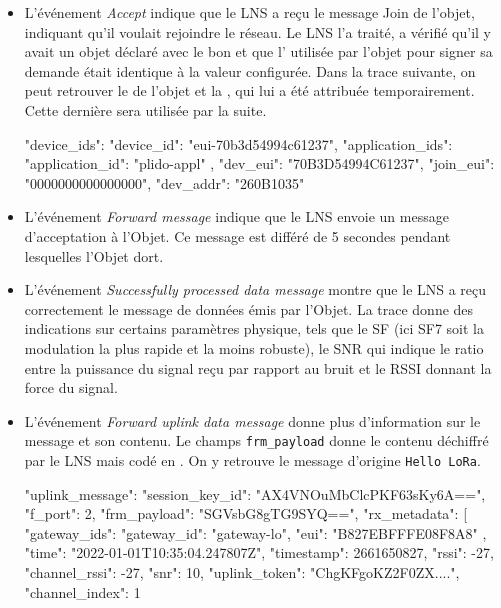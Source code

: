 \begin{itemize}
    \item L'événement \textit{Accept } indique que le LNS a reçu le message Join de l'objet, indiquant qu'il voulait rejoindre le réseau. Le LNS l'a traité, a vérifié qu'il y avait un objet déclaré avec le bon \textit{} et que l'\textit{} utilisée par l'objet pour signer sa demande était identique à la valeur configurée. Dans la trace suivante, on peut retrouver le \textit{} de l'objet et la \textit{}, qui lui a été attribuée temporairement. Cette dernière sera utilisée par la suite.
    
\begin{termc}[backgroundcolor=\color{blue!10}, basicstyle=\ttfamily\small, escapechar=@] 
    "device_ids": {
        "device_id": "eui-70b3d54994c61237",
        "application_ids": {
          "application_id": "plido-appl"
        },
        "dev_eui": "70B3D54994C61237",
        "join_eui": "0000000000000000",
        "dev_addr": "260B1035"
      }
\end{termc}

    \item L'événement \textit{Forward  message} indique que le LNS envoie un message d'acceptation à l'Objet. Ce message est différé de 5 secondes pendant lesquelles l'Objet dort. 
    
    \item L'événement \textit{Successfully processed data message} montre que le LNS a reçu correctement le message de données émis par l'Objet. La trace donne des indications sur certains paramètres physique, tels que le \acl{SF} (ici SF7 soit la modulation la plus rapide et la moins robuste), le SNR qui indique le ratio entre la puissance du signal reçu par rapport au bruit et le \ac{RSSI} donnant la force du signal.   
    
    
    \item L'événement \textit{Forward uplink data message} donne plus d'information sur le message et son contenu. Le champs \texttt{frm\_payload} donne le contenu déchiffré par le LNS mais codé en . On y retrouve le message d'origine \texttt{Hello LoRa}. 
\begin{termc}[backgroundcolor=\color{blue!10}, basicstyle=\ttfamily\small, escapechar=@] 
    "uplink_message": {
      "session_key_id": "AX4VNOuMbClcPKF63sKy6A==",
      "f_port": 2,
      "frm_payload": "SGVsbG8gTG9SYQ==",
      "rx_metadata": [
        {
          "gateway_ids": {
            "gateway_id": "gateway-lo",
            "eui": "B827EBFFFE08F8A8"
          },
          "time": "2022-01-01T10:35:04.247807Z",
          "timestamp": 2661650827,
          "rssi": -27,
          "channel_rssi": -27,
          "snr": 10,
          "uplink_token": "ChgKFgoKZ2F0ZX....",
          "channel_index": 1
        }
      }
\end{termc}


\end{itemize}


